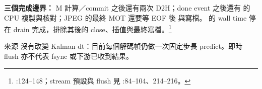 \textbf{三個完成邊界：} M 計算／commit 之後還有兩次 D2H；done event 之後還有  的 CPU 複製與核對；JPEG 的最終 MOT 還要等 EOF 後  與寫檔。 的 wall time 停在 drain 完成，排除其後的 close、插值與最終寫檔。\footnote{:124--148；stream 預設與 flush 見 :84--104、214--216。}

來源  沒有改變 Kalman dt：目前每個解碼幀仍做一次固定步長 predict。即時 flush 亦不代表 fsync 或下游已收到結果。

